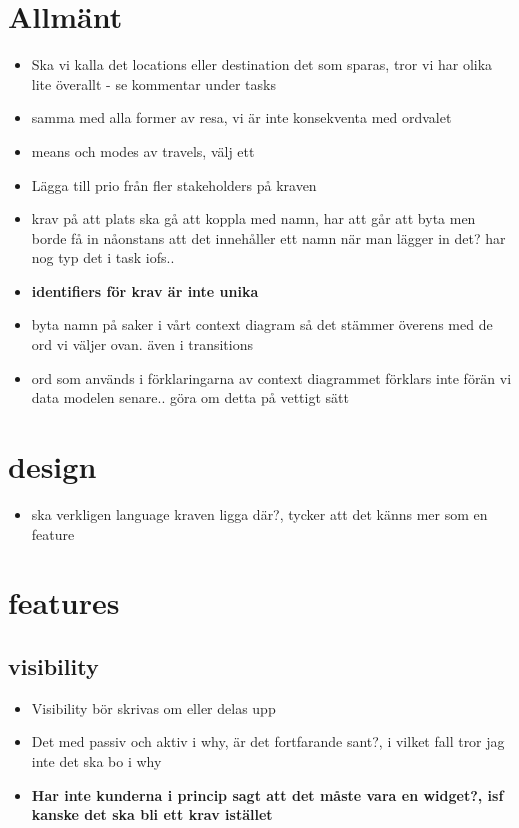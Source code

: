 \documentclass[a4paper]{article}
\begin{document}
	\thispagestyle{empty}
	\setcounter{page}{0}
	\pagebreak
	\tableofcontents
	\pagebreak

\section{Allmänt}
\begin{itemize}

	\item Ska vi kalla det locations eller destination det som sparas, tror vi har olika lite överallt - se kommentar under tasks
	\item samma med alla former av resa, vi är inte konsekventa med ordvalet
	\item means och modes av travels, välj ett

	\item Lägga till prio från fler stakeholders på kraven
	\item krav på att plats ska gå att koppla med namn, har att går att byta men borde få in nåonstans att det innehåller ett namn när man lägger in det? har nog typ det i task iofs.. 
	\item \textbf{identifiers för krav är inte unika}
	\item byta namn på saker i vårt context diagram så det stämmer överens med de ord vi väljer ovan. även i transitions
	\item ord som används i förklaringarna av context diagrammet förklars inte förän vi data modelen senare.. göra om detta på vettigt sätt
\end{itemize}

\section{design}
\begin{itemize}
	\item ska verkligen language kraven ligga där?, tycker att det känns mer som en feature
\end{itemize}

\section{features}
	\subsection{visibility}
		\begin{itemize}
			\item Visibility bör skrivas om eller delas upp
			\item Det med passiv och aktiv i why, är det fortfarande sant?, i vilket fall tror jag inte det ska bo i why
			\item \textbf{Har inte kunderna i princip sagt att det måste vara en widget?, isf kanske det ska bli ett krav istället}

		\end{itemize}
\end{document}
